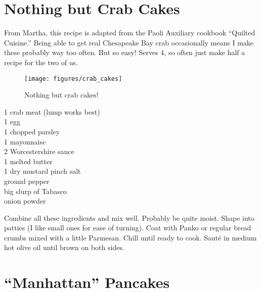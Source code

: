 \section{Nothing but Crab Cakes}

\begin{open}
    From Martha, this recipe is adapted from the Paoli Auxiliary cookbook
    ``Quilted Cuisine.'' Being able to get real Chesapeake Bay crab
    occasionally means I make these probably way too often. But so easy! Serves
    4, so often just make half a recipe for the two of us.
\end{open}
\begin{figure}[h]
    \centering
    \texttt{[image: figures/crab\_cakes]}
    \caption*{Nothing but crab cakes!}
\end{figure}
\begin{ingredients}
    \SI{1}{\pound} crab meat (lump works best)\\
    1 egg\\
    \SI{1}{\tblspoon} chopped parsley\\
    \SI{1}{\tblspoon} mayonnaise\\
    \SI{2}{\teaspoon} Worcestershire sauce\\
    \SI{1}{\tblspoon} melted butter\\
    \SI{1}{\teaspoon} dry mustard
    pinch salt\\
    ground pepper\\
    big slurp of Tabasco\\
    onion powder\\
\end{ingredients}
Combine all these ingredients and mix well. Probably be quite moist. Shape into
patties (I like small ones for ease of turning). Coat with Panko or regular
bread crumbs mixed with a little Parmesan. Chill until ready to cook. Sauté in
medium hot olive oil until brown on both sides.

\section{``Manhattan'' Pancakes}

